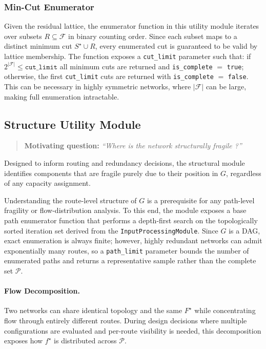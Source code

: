 \documentclass[12pt]{report}
\begin{document}
\subsubsection{Min-Cut Enumerator}
Given the residual lattice, the enumerator function in this utility module iterates over subsets $R \subseteq \mathcal{F}$ in  binary counting order. Since each subset maps to a distinct minimum cut $S^\star \cup R$, every enumerated cut is guaranteed to be valid by lattice membership. The function exposes a \texttt{cut\_limit} parameter such that: if $2^{|\mathcal{F}|} \leq \texttt{cut\_limit}$ all minimum cuts are returned and \texttt{is\_complete} $=$ \texttt{true}; otherwise, the first \texttt{cut\_limit} cuts are returned with \texttt{is\_complete} $=$ \texttt{false}. This can be necessary in highly symmetric networks, where $|\mathcal{F}|$ can be large, making full enumeration intractable.



\subsection{Structure Utility Module}
\begin{quote}
    \textbf{Motivating question:} 
    \textit{``Where is the network structurally fragile ?''}
\end{quote}

Designed to inform routing and redundancy decisions, the structural module identifies components that are fragile purely due to their position in $G$, regardless of any capacity assignment. 

Understanding the route-level structure of $G$ is a prerequisite for any path-level fragility or flow-distribution analysis. To this end, the module exposes a base path enumerator function that performs a depth-first search on the topologically sorted iteration set derived from the \texttt{InputProcessingModule}. Since $G$ is a DAG, exact enumeration is always finite; however, highly redundant networks can admit exponentially many routes, so a \texttt{path\_limit} parameter bounds the number of enumerated paths and returns a representative sample rather than the complete set $\mathcal{P}$.


\paragraph{Flow Decomposition.}
Two networks can share identical topology and the same $F^\star$ while concentrating flow through entirely different routes. During design decisions where multiple configurations are evaluated and per-route visibility is needed, this decomposition exposes how $f^\star$ is distributed across $\mathcal{P}$.
\end{document}
